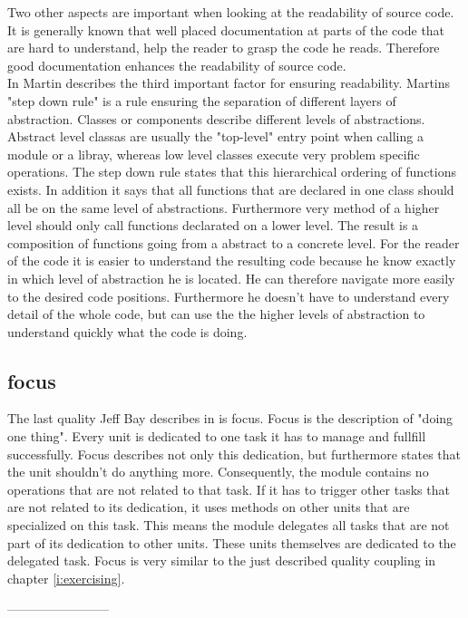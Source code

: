 Two other aspects are important when looking at the readability of source code. It is generally known that well placed documentation at parts of the code that are hard to understand, help the reader to grasp the code he reads. Therefore good documentation enhances the readability of source code.\\

In \cite{cc} Martin describes the third important factor for ensuring readability. Martins "step down rule" is a rule ensuring the separation of different layers of abstraction. Classes or components describe different levels of abstractions. Abstract level classas are usually the "top-level" entry point when calling a module or a libray, whereas low level classes execute very problem specific operations. The step down rule states that this hierarchical ordering of functions exists. In addition it says that all functions that are declared in one class should all be on the same level of abstractions. Furthermore very method of a higher level should only call functions declarated on a lower level. The result is a composition of functions going from a abstract to a concrete level. For the reader of the code it is easier to understand the resulting code because he know exactly in which level of abstraction he is located. He can therefore navigate more easily to the desired code positions. Furthermore he doesn't have to understand every detail of the whole code, but can use the the higher levels of abstraction to understand quickly what the code is doing. 

\subsection{focus}
\label{focus}
The last quality Jeff Bay describes in \cite{oc2008} is focus. Focus is the description of "doing one thing". Every unit is dedicated to one task it has to manage and fullfill successfully. Focus describes not only this dedication, but furthermore states that the unit shouldn't do anything more. Consequently, the module contains no operations that are not related to that task. If it has to trigger other tasks that are not related to its dedication, it uses methods on other units that are specialized on this task. This means the module delegates all tasks that are not part of its dedication to other units. These units themselves are dedicated to the delegated task. Focus is very similar to the just described quality coupling in chapter \ref{i:exercising}.

------------------------

